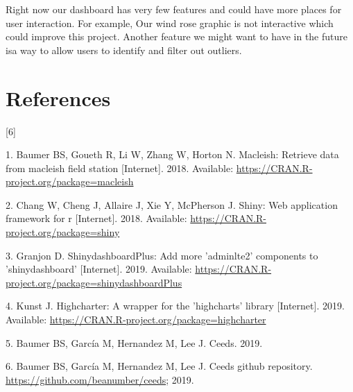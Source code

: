 \documentclass[10pt,letterpaper]{article}
\begin{document}
Right now our dashboard has very few features and could have more places
for user interaction. For example, Our wind rose graphic is not
interactive which could improve this project. Another feature we might
want to have in the future isa way to allow users to identify and filter
out outliers.

\section*{References}\label{references}

{[}6{]}

\hypertarget{refs}{}
\hypertarget{ref-macleish}{}
1. Baumer BS, Goueth R, Li W, Zhang W, Horton N. Macleish: Retrieve data
from macleish field station {[}Internet{]}. 2018. Available:
\url{https://CRAN.R-project.org/package=macleish}

\hypertarget{ref-shiny}{}
2. Chang W, Cheng J, Allaire J, Xie Y, McPherson J. Shiny: Web
application framework for r {[}Internet{]}. 2018. Available:
\url{https://CRAN.R-project.org/package=shiny}

\hypertarget{ref-dashboardplus}{}
3. Granjon D. ShinydashboardPlus: Add more 'adminlte2' components to
'shinydashboard' {[}Internet{]}. 2019. Available:
\url{https://CRAN.R-project.org/package=shinydashboardPlus}

\hypertarget{ref-highcharter}{}
4. Kunst J. Highcharter: A wrapper for the 'highcharts' library
{[}Internet{]}. 2019. Available:
\url{https://CRAN.R-project.org/package=highcharter}

\hypertarget{ref-ceeds}{}
5. Baumer BS, García M, Hernandez M, Lee J. Ceeds. 2019.

\hypertarget{ref-ceeds_repo}{}
6. Baumer BS, García M, Hernandez M, Lee J. Ceeds github repository.
\url{https://github.com/beanumber/ceeds}; 2019.

\nolinenumbers
\end{document}
